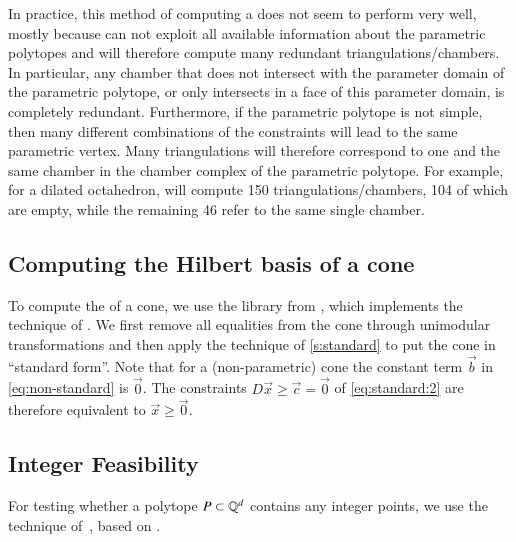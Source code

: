 In practice, this method of computing a 
does not seem to perform very well, mostly because
 can not exploit all available information
about the parametric polytopes and will therefore compute
many redundant triangulations/chambers.
In particular, any chamber that does not intersect with
the parameter domain of the parametric polytope, or only
intersects in a face of this parameter domain, is completely redundant.
Furthermore, if the parametric polytope is not simple, then many
different combinations of the constraints will lead to the same parametric
vertex.  Many triangulations will therefore correspond to one and the
same chamber in the chamber complex of the parametric polytope.
For example, for a dilated octahedron,  will
compute 150 triangulations/chambers, 104 of which are empty,
while the remaining 46 refer to the same single chamber.


\subsection{Computing the Hilbert basis of a cone}
\label{s:hilbert}

To compute the  of a cone, we use
the  library from  ,
which implements the technique of .
We first remove all equalities from the cone through unimodular
transformations and then apply the technique of \autoref{s:standard}
to put the cone in ``standard form''.  Note that for a (non-parametric)
cone the constant term $\vec b$ in \eqref{eq:non-standard} is $\vec 0$.
The constraints $D \vec x \ge \vec c = \vec 0$ of \eqref{eq:standard:2}
are therefore equivalent to $\vec x \ge \vec 0$.


\subsection{Integer Feasibility}
\label{s:feasibility}

For testing whether a polytope $P \subset \mathbb{Q}^d$ contains any integer points,
we use the technique of~,
based on .

